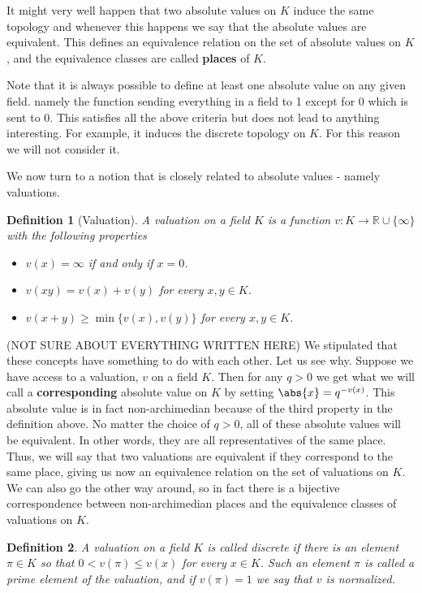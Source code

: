 \documentclass{article}
\newtheorem{definition}{Definition}[section]
\newcommand{\mbb}[1]{\mathbb{#1}}
\begin{document}
It might very well happen that two absolute values on $K$ induce the same topology and whenever this happens we say that the absolute values are equivalent. This defines an equivalence relation on the set of absolute values on $K$, and the equivalence classes are called \textbf{places} of $K$. 

Note that it is always possible to define at least one absolute value on any given field. namely the function sending everything in a field to 1 except for 0 which is sent to 0. This satisfies all the above criteria but does not lead to anything interesting. For example, it induces the discrete topology on $K$. For this reason we will not consider it. 

We now turn to a notion that is closely related to absolute values - namely valuations. 

\begin{definition}[Valuation]
    A valuation on a field $K$ is a function $v : K \to \mbb R \cup \{\infty\}$ with the following properties 
    \begin{itemize}
        \item $v(x) = \infty$ if and only if $x = 0$.
        \item $v(xy) = v(x) + v(y)$ for every $x,y \in K$. 
        \item $v(x + y) \geq \min \{v(x), v(y)\}$ for every $x,y \in K$.
    \end{itemize}
\end{definition}

(NOT SURE ABOUT EVERYTHING WRITTEN HERE)
We stipulated that these concepts have something to do with each other. Let us see why. Suppose we have access to a valuation, $v$ on a field $K$. Then for any $q > 0$ we get what we will call a \textbf{corresponding} absolute value on $K$ by setting $\abs{x} = q^{-v(x)}$. This absolute value is in fact non-archimedian because of the third property in the definition above. No matter the choice of $q > 0$, all of these absolute values will be equivalent. In other words, they are all representatives of the same place. Thus, we will say that two valuations are equivalent if they correspond to the same place, giving us now an equivalence relation on the set of valuations on $K$. We can also go the other way around, so in fact there is a bijective correspondence between non-archimedian places and the equivalence classes of valuations on $K$.

\begin{definition}
    A valuation on a field $K$ is called discrete if there is an element $\pi \in K$ so that $0 < v(\pi) \leq v(x)$ for every $x \in K$. Such an element $\pi$ is called a prime element of the valuation, and if $v(\pi) = 1$ we say that $v$ is normalized. 
\end{definition}
\end{document}
